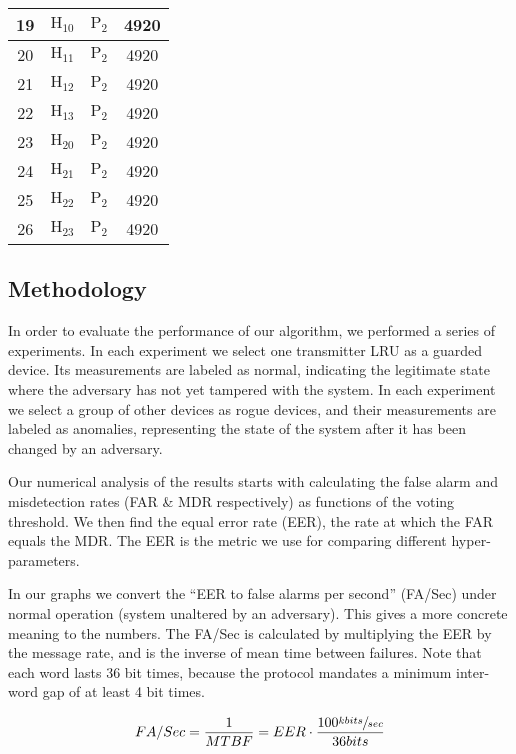 \documentclass[conference]{IEEEtran}
\begin{document}
\begin{table}
\begin{tabular}{|c | c c c|}
      19 & \(\text{H}_{10}\) & \(\text{P}_2\) & 4920 \\
      \hline
      20 & \(\text{H}_{11}\) & \(\text{P}_2\) & 4920 \\
      \hline
      21 & \(\text{H}_{12}\) & \(\text{P}_2\) & 4920 \\
      \hline
      22 & \(\text{H}_{13}\) & \(\text{P}_2\) & 4920 \\
      \hline
      23 & \(\text{H}_{20}\) & \(\text{P}_2\) & 4920 \\
      \hline
      24 & \(\text{H}_{21}\) & \(\text{P}_2\) & 4920 \\
      \hline
      25 & \(\text{H}_{22}\) & \(\text{P}_2\) & 4920 \\
      \hline
      26 & \(\text{H}_{23}\) & \(\text{P}_2\) & 4920 \\
      \hline
    \end{tabular}
  \end{table}
  
\subsection{Methodology}
  In order to evaluate the performance of our algorithm, we performed a series of experiments. In each experiment we select one transmitter LRU as a guarded device. Its measurements are labeled as normal, indicating the legitimate state where the adversary has not yet tampered with the system. In each experiment we select a group of other devices as rogue devices, and their measurements are labeled as anomalies, representing the state of the system after it has been changed by an adversary.
  
  Our numerical analysis of the results starts with calculating the false alarm and misdetection rates (FAR \& MDR respectively) as functions of the voting threshold. We then find the equal error rate (EER), the rate at which the FAR equals the MDR. The EER is the metric we use for comparing different hyper-parameters.
  
   In our graphs we convert the ``EER to false alarms per second'' (FA/Sec) under normal operation (system unaltered by an adversary). This gives a more concrete meaning to the numbers. The FA/Sec is calculated by multiplying the EER by the message rate, and is the inverse of mean time between failures. Note that each word lasts 36 bit times, because the protocol mandates a minimum inter-word gap of at least 4 bit times.
  
  \[FA/Sec = \frac{1}{MTBF} = EER \cdot \frac{100 \sfrac{kbits}{sec}}{36bits}\]
  
\end{document}
